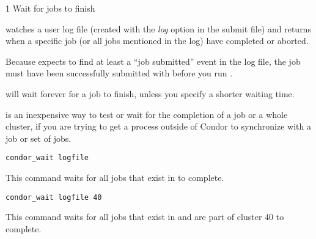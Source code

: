 \begin{ManPage}{\label{man-condor-wait}}{1}
{Wait for jobs to finish}

\Synopsis
{}
\ToolArgsBase

\ToolArgsBase
{}



\Description

 watches a user log file (created with the \emph{log}
option in the submit file) and returns when a specific job (or all
jobs mentioned in the log) have completed or aborted. 

Because  expects to find at least a ``job submitted''
event in the log file, the job must have been successfully submitted
with  before you run .

 will wait forever for a job to finish, unless you
specify a shorter waiting time.

\begin{Options}
    \ToolArgsBaseDesc

\end{Options}

\GenRem 

 is an inexpensive way to test or wait for the completion
of a job or a whole cluster, if you are trying to get a process
outside of Condor to synchronize with a job or set of jobs.

\Examples

\begin{verbatim}
condor_wait logfile
\end{verbatim}
This command waits for all jobs that exist in  to complete.

\begin{verbatim}
condor_wait logfile 40
\end{verbatim}
This command waits for all jobs that exist in  and are part
of cluster 40 to complete.


\end{ManPage}
